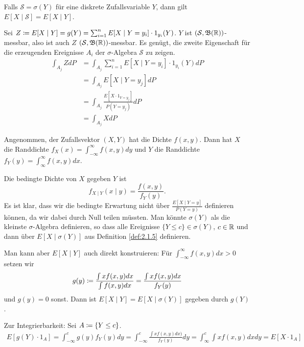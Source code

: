 \documentclass[a4paper,twoside,DIV15,BCOR12mm]{scrbook}
\newcommand{\borel}{{\mathfrak B}}
\begin{document}
\begin{lemma}
Falls $\mathcal S=\sigma(Y)$ für eine diskrete Zufallsvariable $Y$, dann gilt $E[X\mid \mathcal S] = E[X\mid Y]$.
\end{lemma}

\begin{beweis}
Sei $Z\da E[X\mid Y] = g(Y) = \sum_{i=1}^n E[X\mid Y = y_i] \cdot 1_{y_i}(Y)$. $Y$ ist $(\mathcal S,\borel(\MdR))$-messbar, also ist auch $Z$ $(\mathcal S,\borel(\MdR))$-messbar. Es genügt, die zweite Eigenschaft für die erzeugenden Ereignisse $A_i$ der $\sigma$-Algebra $\mathcal S$ zu zeigen.
\begin{align*}
\int_{A_j}Zd P &= \int_{A_j} \sum_{i=1}^n E[X\mid Y=y_i]\cdot 1_{y_i}(Y)dP \\
&= \int_{A_j} E[X \mid Y=y_j] dP \\
&= \int_{A_j} \frac{E[X\cdot 1_{Y=y_j}]}{P(Y=y_j)} dP \\
&= \int_{A_j} X dP
\end{align*}
\end{beweis}

\begin{bemerkung}
Angenommen, der Zufallsvektor $(X,Y)$ hat die Dichte $f(x,y)$. Dann hat $X$ die Randdichte $f_X(x) = \int_{-\infty}^\infty f(x,y)dy$ und $Y$ die Randdichte $f_Y(y)=\int_{\infty}^\infty f(x,y)dx$.

Die bedingte Dichte von $X$ gegeben $Y$ ist 
\[
f_{X\mid Y} (x\mid y) = \frac{f(x,y)}{f_Y(y)}.
\]
Es ist klar, dass wir die bedingte Erwartung nicht über $\frac{E[X\mid Y=y]}{P(Y=y)}$ definieren können, da wir dabei durch Null teilen müssten. Man könnte $\sigma(Y)$ als die kleinste $\sigma$-Algebra definieren, so dass alle Ereignisse $\{Y\le c\}\in\sigma(Y)$, $c\in\mathbb{R}$ und dann über $E[X\mid \sigma(Y)]$ aus Definition \ref{def:2.1.5} definieren.

Man kann aber $E[X\mid Y]$ auch direkt konstruieren: Für $\int_{-\infty}^\infty f(x,y)dx > 0$ setzen wir 
\[
g(y) \da \frac{\int x f(x,y)dx}{\int f(x,y)dx} = 
\frac{\int x f(x,y)dx}{f_Y(y)}
\]
und $g(y) = 0$ sonst. Dann ist $E[X\mid Y] = E[X\mid \sigma(Y)]$ gegeben durch $g(Y)$.

Zur Integrierbarkeit: Sei $A\da \{Y\le c\}$.
\begin{align*}
E[g(Y)\cdot 1_A] = \int_{-\infty}^c g(y) f_Y(y)dy = \int_{-\infty}^c \frac{\int x f(x,y)dx)}{f_Y(y)} dy = \int_{\infty}^c \int x f(x,y)dxdy = E[X\cdot 1_A]
\end{align*}
\end{bemerkung}
\end{document}
